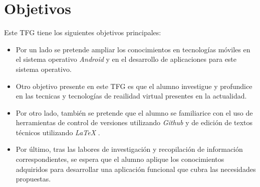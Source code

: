 %
%
%
%


\chapter{Objetivos} \label{chap:Objetivos}  

Este TFG tiene los siguientes objetivos principales:

	
\begin{itemize}
\item  	Por un lado se pretende ampliar los conocimientos en tecnologías móviles en el sistema operativo \textit{Android} \cite{URL::Android} y en el desarrollo de aplicaciones para este sistema operativo.
\item Otro objetivo presente en este TFG es que el alumno investigue y profundice en las tecnicas y tecnologías de reailidad virtual presentes en la actualidad.
\item Por otro lado, también se pretende que el alumno se familiarice con el uso de herramientas de control de versiones utilizando \textit{Github} \cite{URL::Github} y de edición de textos técnicos utilizando \textit{LaTeX}  \cite{URL::LaTeX}.
\item  Por último, tras las labores de investigación y recopilación de información correspondientes, se espera que el alumno aplique los conocimientos adquiridos para desarrollar una aplicación funcional que cubra las necesidades propuestas.
\end{itemize}